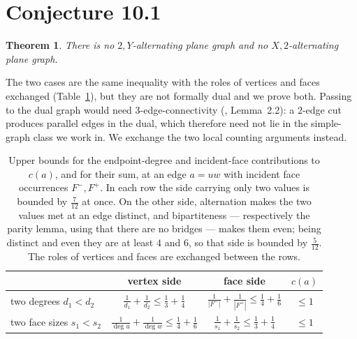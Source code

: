 \documentclass{baustms}
\theoremstyle{cupthm}
\newtheorem{theorem}{Theorem}[section]
\theoremstyle{cupdefn}
\theoremstyle{cuprem}
\begin{document}
\section{Conjecture 10.1}\label{sec:101}

\begin{theorem}\label{thm:101}
There is no $2,Y$-alternating plane graph and no $X,2$-alternating plane graph.
\end{theorem}

The two cases are the same inequality with the roles of vertices and faces
exchanged (Table~\ref{tab:budget}), but they are not formally dual and we prove
both. Passing to the dual
graph would need $3$-edge-connectivity (\cite{AHSSV2015}, Lemma~2.2): a
$2$-edge cut produces parallel edges in the dual, which therefore need not lie in
the simple-graph class we work in. We exchange the two local counting arguments
instead.

\begin{table}[ht]
\centering
\begin{tabular}{lccc}
\toprule
 & vertex side & face side & $c(a)$ \\
\midrule
two degrees $d_1<d_2$
 & $\tfrac1{d_1}+\tfrac1{d_2} \le \tfrac13+\tfrac14$
 & $\tfrac1{|F^-|}+\tfrac1{|F^+|} \le \tfrac14+\tfrac16$
 & $\le 1$ \\[2pt]
two face sizes $s_1<s_2$
 & $\tfrac1{\deg u}+\tfrac1{\deg w} \le \tfrac14+\tfrac16$
 & $\tfrac1{s_1}+\tfrac1{s_2} \le \tfrac13+\tfrac14$
 & $\le 1$ \\
\bottomrule
\end{tabular}
\caption{Upper bounds for the endpoint-degree and incident-face contributions to
$c(a)$, and for their sum, at an edge $a=uw$ with incident face occurrences
$F^-,F^+$. In each row the side carrying only two values is bounded by
$\tfrac7{12}$ at once. On the other side, alternation makes the two values met
at an edge distinct, and bipartiteness --- respectively the parity lemma, using
that there are no bridges --- makes them even; being distinct and even they are
at least $4$ and $6$, so that side is bounded by $\tfrac5{12}$. The roles of vertices and faces are exchanged between
the rows.}\label{tab:budget}
\end{table}
\end{document}
